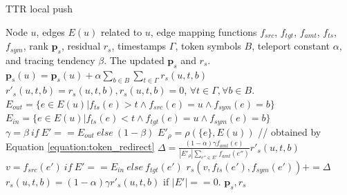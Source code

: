 \begin{algorithm}[t]
    \caption{TTR local push}
    \label{alg:ttr_local_push}
    \begin{algorithmic}[1]
        \REQUIRE Node $u$, edges $E(u)$ related to $u$, edge mapping functions $f_{src}$, $f_{tgt}$, $f_{amt}$, $f_{ts}$, $f_{sym}$, rank $\bm{p}_s$, residual $r_s$,
        timestamps $\Gamma$, token symbols $B$, 
        teleport constant $\alpha$, and tracing tendency $\beta$.
        \ENSURE The updated $\bm{p}_s$ and $r_s$.
        \STATE $\bm{p}_s(u) = \bm{p}_s(u) + \alpha \sum\limits_{b \in B}\sum\limits_{t \in \Gamma}r_s(u,t,b)$
        \STATE $r'_s(u,t,b)=r_s(u,t,b), r_s(u,t,b)=0$, $\forall t\in \Gamma, \forall b\in B$.
            \STATE $E_{out}=\{e\in E(u)|f_{ts}(e)>t\wedge f_{src}(e)=u\wedge f_{sym}(e)=b\}$
            \STATE $E_{in}=\{e\in E(u)|f_{ts}(e)<t\wedge f_{tgt}(e)=u\wedge f_{sym}(e)=b\}$
                \STATE $\gamma = \beta \ if \  E'==E_{out} \ else \ (1-\beta)$
                    \STATE $E'_{\rho}=\rho(\{e\}, E(u))$ // obtained by Equation \ref{equation:token_redirect}
                        \STATE $\Delta = \frac{(1-\alpha)\gamma f_{amt}(e)}{|E'_{\rho}|\sum\limits_{e ''\in E'}f_{amt}(e'')} r'_s(u,t,b)$
                        \STATE $v=f_{src}(e') \ if \ E'==E_{in} \ else \ f_{tgt}(e')$
                        \STATE $r_s(v,f_{ts}(e'),f_{sym}(e'))+=\Delta$
                    \ENDFOR
                \ENDFOR
                \STATE $r_s(u,t,b)=(1-\alpha)\gamma r'_s(u,t,b)$ if $|E'|==0$.
            \ENDFOR
        \ENDFOR
        \RETURN $\bm{p}_s, r_s$
    \end{algorithmic}
\end{algorithm}

